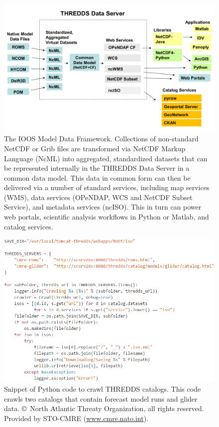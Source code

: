 \documentclass[osd, online, hvmath]{copernicus}
\begin{document}
\begin{figure}
\includegraphics[width=130mm]{framework_slide.png}
\caption{The IOOS Model Data Framework.  Collections of non-standard NetCDF or Grib files are transformed via NetCDF Markup Language (NcML) into aggregated, standardized datasets that can be represented internally in the THREDDS Data Server in a common data model.  This data in common form can then be delivered via a number of standard services, including map services (WMS), data services (OPeNDAP, WCS and NetCDF Subset Service), and metadata services (ncISO).  This in turn can power web portals, scientific analysis workflows in Python or Matlab,  and catalog services. }
\label{osd-2015-0064-f00.pdf}
\end{figure}


\begin{figure}
\includegraphics[width=130mm]{os-2015-64-discussions-f01.png}
\caption{Snippet of Python code to crawl THREDDS catalogs. This code
  crawls two catalogs that contain forecast model runs and glider
  data. \copyright~North Atlantic Threaty Organization, all rights reserved. Provided by STO-CMRE (\url{www.cmre.nato.int}).}
\label{osd-2015-0064-f01.pdf}
\end{figure}
\end{document}
